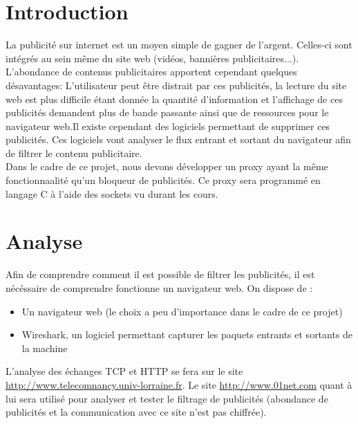 \documentclass[a4paper,11pt, oneside]{book}
\author{Yann Prono, Quentin Tardivon}
\date{\today}
\begin{document}
	\begin{titlepage}
		
	\end{titlepage}


	\newpage\newpage\null\thispagestyle{empty}
	\newpage
		\tableofcontents
		\thispagestyle{empty}


	\chapter{Introduction}
	\setcounter{page}{1}

		La publicité sur internet est un moyen simple de gagner de l'argent.
		Celles-ci sont intégrés au sein même du site web (vidéos, bannières publicitaires...). L'abondance de contenus publicitaires apportent
		cependant quelques désavantages: L'utilisateur peut être distrait par ces publicités, la lecture du site web est plus difficile
		étant donnée la quantité d'information et l'affichage de ces publicités demandent plus de bande passante
		ainsi que de ressources pour le navigateur web.Il existe cependant des logiciels permettant de supprimer
		ces publicités. Ces logiciels vont analyser le flux entrant et sortant du navigateur afin de filtrer le contenu publicitaire.\\

		\noindent Dans le cadre de ce projet, nous devons développer un proxy ayant la même fonctionnaalité qu'un bloqueur de publicités.
		Ce proxy sera programmé en langage C à l'aide des sockets vu durant les cours.


	\chapter{Analyse}

		Afin de comprendre comment il est possible de filtrer les publicités, il est nécéssaire de comprendre fonctionne un navigateur web.
		On dispose de :
		\begin{itemize}
			\item Un navigateur web (le choix a peu d'importance dans le cadre de ce projet)
			\item Wireshark, un logiciel permettant capturer les paquets entrants et sortants de la machine\\
		\end{itemize}
		\noindent L'analyse des échanges TCP et HTTP se fera sur le site
		\href{http://www.telecomnancy.univ-lorraine.fr}{http://www.telecomnancy.univ-lorraine.fr}.
		Le site \href{http://www.01net.com}{http://www.01net.com} quant à lui sera utilisé pour
		analyser et tester le filtrage de publicités (abondance de publicités et la communication avec ce site n'est pas chiffrée).
\end{document}
